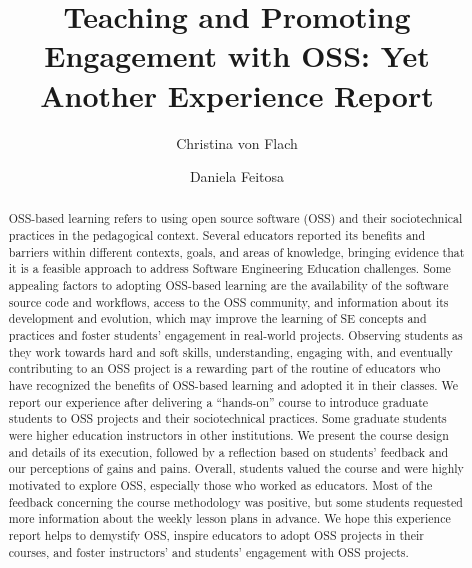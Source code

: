\documentclass[sigconf]{acmart}
\begin{document}
\title{Teaching and Promoting Engagement with OSS: Yet Another Experience Report}
\author{Christina von Flach}
\author{Daniela Feitosa}
\authornotemark[1]

\renewcommand{\shortauthors}{Flach, C. and Feitosa, D.}

\begin{abstract}
OSS-based learning refers to using open source software (OSS) and their sociotechnical practices in the pedagogical context. Several educators reported its benefits and barriers within different contexts, goals, and areas of knowledge, bringing evidence that it is a feasible approach to address Software Engineering Education challenges. 
Some appealing factors to adopting OSS-based learning are the availability of the software source code and workflows, access to the OSS community, and information about its development and evolution, which may improve the learning of SE concepts and practices and foster students' engagement in real-world projects.
Observing students as they work towards hard and soft skills, understanding, engaging with, and eventually contributing to an OSS project is a rewarding part of the routine of educators who have recognized the benefits of OSS-based learning and adopted it in their classes.
We report our experience after delivering a ``hands-on'' course to introduce graduate students to OSS projects and their sociotechnical practices. 
Some graduate students were higher education instructors in other institutions. We present the course design and details of its execution, followed by a reflection based on students' feedback and our perceptions of gains and pains.
Overall, students valued the course and were highly motivated to explore OSS, especially those who worked as educators. Most of the feedback concerning the course methodology was positive, 
but some students requested more information about the weekly lesson plans in advance.
We hope this experience report helps to demystify OSS, inspire educators to adopt OSS projects in their courses,  and foster instructors' and students' engagement with OSS projects.

\end{abstract}
\end{document}
